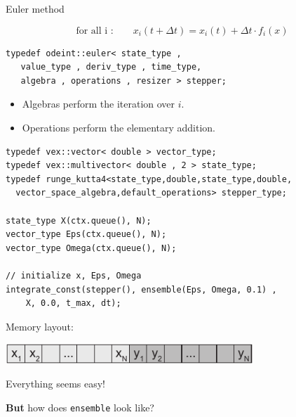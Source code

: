 







\begin{frame}[fragile]


 \vspace{2ex}

Euler method

$$\text{for all i :}  \quad \quad x_i(t+\Delta t) = x_i(t) + \Delta t \cdot f_i(x)$$

\vspace{2ex}

\begin{lstlisting}
typedef odeint::euler< state_type ,
   value_type , deriv_type , time_type,
   algebra , operations , resizer > stepper; 
\end{lstlisting}


\begin{itemize}
\item Algebras perform the iteration over $i$.
\item Operations perform the elementary addition.
\end{itemize}


\end{frame}




\begin{frame}[fragile]


 \begin{lstlisting}[basicstyle=\scriptsize\ttfamily]
typedef vex::vector< double > vector_type;
typedef vex::multivector< double , 2 > state_type;
typedef runge_kutta4<state_type,double,state_type,double,
  vector_space_algebra,default_operations> stepper_type;

state_type X(ctx.queue(), N);
vector_type Eps(ctx.queue(), N);
vector_type Omega(ctx.queue(), N);

// initialize x, Eps, Omega
integrate_const(stepper(), ensemble(Eps, Omega, 0.1) ,
    X, 0.0, t_max, dt);
 \end{lstlisting}

\vspace{2ex}

\centerline{Memory layout:}

\vspace{1ex}

\centerline{\includegraphics[draft=false,width=0.7\textwidth]{memory_layout2.pdf}}

\vspace{2ex}

\centerline{Everything seems easy!}
\vspace{2ex}
\centerline{{\bf But} how does {\tt ensemble} look like?}
 

\end{frame}




